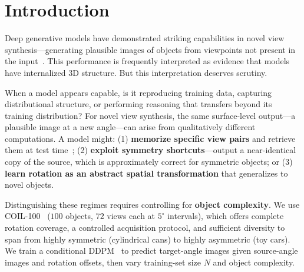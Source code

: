 \documentclass[11pt]{article}
\begin{document}
\section{Introduction}
\label{sec:intro}

Deep generative models have demonstrated striking capabilities in novel view
synthesis---generating plausible images of objects from viewpoints not present
in the input~\cite{liu2023zero,mildenhall2020nerf,rombach2022ldm}. This
performance is frequently interpreted as evidence that models have internalized
3D structure. But this interpretation deserves scrutiny.

When a model appears capable, is it reproducing training data, capturing
distributional structure, or performing reasoning that transfers beyond its
training distribution? For novel view synthesis, the same surface-level
output---a plausible image at a new angle---can arise from qualitatively
different computations. A model might: (1) \textbf{memorize specific view
pairs} and retrieve them at test time~\cite{carlini2023extracting,
somepalli2023diffusion,yoon2025memorization}; (2) \textbf{exploit symmetry
shortcuts}---output a near-identical copy of the source, which is approximately
correct for symmetric objects; or (3) \textbf{learn rotation as an abstract
spatial transformation} that generalizes to novel objects.

Distinguishing these regimes requires controlling for \textbf{object
complexity}. We use COIL-100~\cite{nene1996coil} ($100$ objects, $72$ views each
at $5^{\circ}$ intervals), which offers complete rotation coverage, a controlled
acquisition protocol, and sufficient diversity to span from highly symmetric
(cylindrical cans) to highly asymmetric (toy cars). We train a conditional
DDPM~\cite{ho2020ddpm} to predict target-angle images given source-angle images
and rotation offsets, then vary training-set size $N$ and object complexity.
\end{document}
